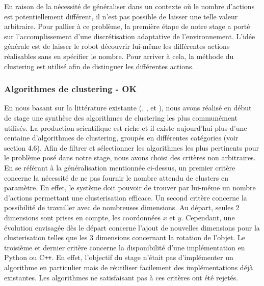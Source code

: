 \documentclass[draft]{llncs}
\begin{document}
En raison de la nécessité de généraliser dans un contexte où le nombre d'actions est potentiellement différent, il n'est pas possible de laisser une telle valeur arbitraire.
Pour pallier à ce problème, la première étape de notre stage a porté sur l'accomplissement d'une discrétisation adaptative de l'environnement.
L'idée générale est de laisser le robot découvrir lui-même les différentes actions réalisables sans en spécifier le nombre.
Pour arriver à cela, la méthode du clustering est utilisé afin de distinguer les différentes actions.





\subsubsection{Algorithmes de clustering - OK}

En nous basant sur la littérature existante (\cite{Xu2015}, \cite{Andreopoulos2009}, \cite{Fahad2014} et \cite{Sajana2016}), nous avons réalisé en début de stage une synthèse des algorithmes de clustering les plus communément utilisés.
La production scientifique est riche et il existe aujourd'hui plus d'une centaine d'algorithmes de clustering, groupés en différentes catégories (voir section 4.6).
Afin de filtrer et sélectionner les algorithmes les plus pertinents pour le problème posé dans notre stage, nous avons choisi des critères non arbitraires.
En se référant à la généralisation mentionnée ci-dessus, un premier critère concerne la nécessité de ne pas fournir le nombre attendu de clusters en paramètre.
En effet, le système doit pouvoir de trouver par lui-même un nombre d'actions permettant une clusterisation efficace.
Un second critère concerne la possibilité de travailler avec de nombreuses dimensions.
Au départ, seules 2 dimensions sont prises en compte, les coordonnées $x$ et $y$.
Cependant, une évolution envisagée dès le départ concerne l'ajout de nouvelles dimensions pour la clusterisation telles que les 3 dimensions concernant la rotation de l'objet. 
Le troisième et dernier critère concerne la disponibilité d'une implémentation en Python ou C{}\verb!++!.
En effet, l'objectif du stage n'était pas d'implémenter un algorithme en particulier mais de réutiliser facilement des implémentations déjà existantes.
Les algorithmes ne satisfaisant pas à ces critères ont été rejetés.
\end{document}
